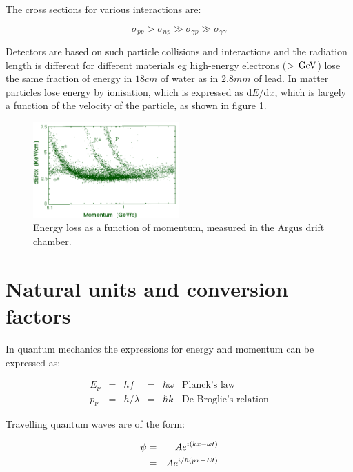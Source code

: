 The cross sections for various interactions are:

\[
  \sigma_{pp} > \sigma_{np} \gg \sigma_{\gamma p} \gg \sigma_{\gamma \gamma}
\]

Detectors are based on such particle collisions and interactions and the radiation length is different for different materials eg high-energy electrons ($> \mathrm{\,GeV}$) lose the same fraction of energy in $18 cm$ of water as in $2.8mm$ of lead.  In matter particles lose energy by ionisation, which is expressed as $\mathrm{d}E / \mathrm{d} x$, which is largely a function of the velocity of the particle, as shown in figure \ref{fig:ch2_energyLoss}.

\begin{figure}[!htb]
  \begin{center}
    \includegraphics[width=0.5\textwidth]{images/chapter_2/Argus.pdf}
    \caption[Energy loss as a function of momentum]{Energy loss as a function of momentum, measured in the Argus drift chamber. \cite{energyLoss}}
    \label{fig:ch2_energyLoss}
  \end{center}
\end{figure}

\section{Natural units and conversion factors}

In quantum mechanics the expressions for energy and momentum can be expressed as:

\[
  \begin{array}{cccccl}
  E_{\nu} & = & hf & = & \hbar \omega    & \textrm{Planck's law} \\
  p_{\nu} & = & h/\lambda & = & \hbar k & \textrm{De Broglie's relation}
  \end{array}
\]

Travelling quantum waves are of the form:

\begin{eqnarray*}
  \psi & = & A e^{i\left( kx - \omega t\right)} \\
  & = & A e^{i/\hbar\left(px - Et\right)}
\end{eqnarray*}

